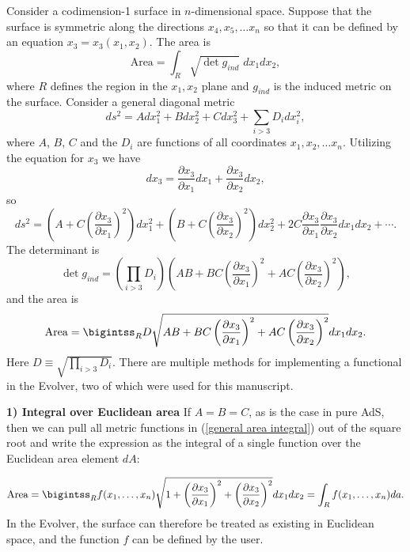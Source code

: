 \documentclass[11 pt]{article}
\begin{document}
Consider a codimension-1 surface in $n$-dimensional space. Suppose that the surface is symmetric along the directions $x_4, x_5,\ldots x_n$ so that it can be defined by an equation $x_3 = x_3(x_1,x_2)$. The area is
\begin{equation}
    \text{Area} = \int_R \sqrt{\det g_{ind}}\; dx_1 dx_2,
\end{equation}
where $R$ defines the region in the $x_1,x_2$ plane and $g_{ind}$ is the induced metric on the surface. Consider a general diagonal metric
\begin{equation}
    ds^2 = Adx_1^2 + Bdx_2^2 + Cdx_3^2 + \sum_{i>3} D_i dx_i^2,
\end{equation}
where $A$, $B$, $C$ and the $D_i$ are functions of all coordinates $x_1,x_2,\ldots x_n$. Utilizing the equation for $x_3$ we have
\begin{equation}
    dx_3 = \frac{\partial x_3}{\partial x_1}dx_1 + \frac{\partial x_3}{\partial x_2}dx_2,
\end{equation}
so
\begin{equation}
    ds^2 = \left(A + C\left(\frac{\partial x_3}{\partial x_1}\right)^2\right)dx_1^2 + \left(B + C\left(\frac{\partial x_3}{\partial x_2}\right)^2\right)dx_2^2 + 2C\frac{\partial x_3}{\partial x_1}\frac{\partial x_3}{\partial x_2}dx_1 dx_2 + \cdots.
\end{equation}
The determinant is
\begin{equation}
    \det{g_{ind}} = \left(\prod_{i>3} D_i\right)\left(AB + BC\left(\frac{\partial x_3}{\partial x_1}\right)^2 + AC\left(\frac{\partial x_3}{\partial x_2}\right)^2\right),
\end{equation}
and the area is
\begin{equation}\label{general area integral}
    \text{Area} = \bigintss_R D\sqrt{AB + BC\left(\frac{\partial x_3}{\partial x_1}\right)^2 + AC\left(\frac{\partial x_3}{\partial x_2}\right)^2} dx_1 dx_2.
\end{equation}
Here $D \equiv \sqrt{\prod_{i>3} D_i}$. There are multiple methods for implementing a functional in the Evolver, two of which were used for this manuscript.

\textbf{1) Integral over Euclidean area}
If $A=B=C$, as is the case in pure AdS, then we can pull all metric functions in (\ref{general area integral}) out of the square root and write the expression as the integral of a single function over the Euclidean area element $dA$:

\begin{equation} \label{int over Euc}
    \text{Area} = \bigintss_R f(x_1,\ldots,x_n) \sqrt{1 + \left(\frac{\partial x_3}{\partial x_1}\right)^2 + \left(\frac{\partial x_3}{\partial x_2}\right)^2} dx_1 dx_2 = \int_R f(x_1,\ldots,x_n) da.
\end{equation}
In the Evolver, the surface can therefore be treated as existing in Euclidean space, and the function $f$ can be defined by the user.
\end{document}
